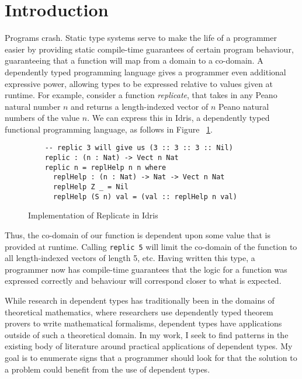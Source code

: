 \section{Introduction}
Programs crash. Static type systems serve to make the life of a programmer
easier by providing static compile-time guarantees of certain program behaviour,
guaranteeing that a function will map from a domain to a co-domain. A
dependently typed programming language gives a programmer even additional
expressive power, allowing types to be expressed relative to values given at
runtime. For example, consider a function \textit{replicate}, that takes in any
Peano natural number $n$ and returns a length-indexed vector of $n$ Peano
natural numbers of the value $n$. We can express this in Idris, a
dependently typed functional programming language, as follows in Figure
~\ref{replicate_in_idris}. 

\begin{figure}[ht!]
  \caption{Implementation of Replicate in Idris}
  \label{replicate_in_idris}
  \begin{lstlisting}
    -- replic 3 will give us (3 :: 3 :: 3 :: Nil)
    replic : (n : Nat) -> Vect n Nat
    replic n = replHelp n n where
      replHelp : (n : Nat) -> Nat -> Vect n Nat
      replHelp Z _ = Nil
      replHelp (S n) val = (val :: replHelp n val)
  \end{lstlisting}
\end{figure}

Thus, the co-domain of our function is dependent upon some value that is
provided at runtime. Calling \texttt{replic 5} will limit the co-domain of the
function to all length-indexed vectors of length 5, etc. Having written this
type, a programmer now has compile-time guarantees that the logic for a function
was expressed correctly and behaviour will correspond closer to what is
expected.

While research in dependent types has traditionally been in the domains of
theoretical mathematics, where researchers use dependently typed theorem provers
to write mathematical formalisms, dependent types have applications outside of
such a theoretical domain. In my work, I seek to find patterns in the existing
body of literature around practical applications of dependent types. My goal is
to enumerate signs that a programmer should look for that the solution to a
problem could benefit from the use of dependent types. 

